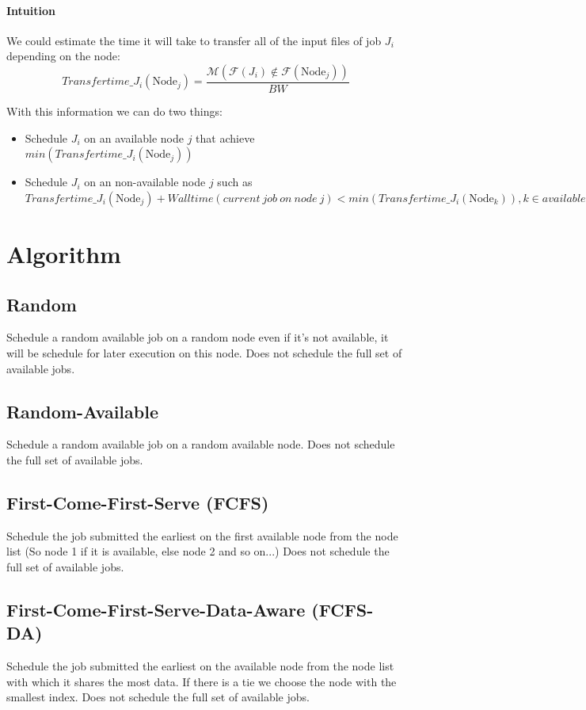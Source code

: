 \documentclass[a4paper]{article}
\newcommand{\Node}[1]{\ensuremath{\mathrm{Node}_{#1}}\xspace}
\newcommand{\inputs}{\ensuremath{\mathcal{F}}\xspace}
\newcommand{\memory}{\ensuremath{\mathcal{M}}\xspace}
\newcommand{\bandwidth}{\mathit{BW}\xspace}
\newcommand{\walltime}{\mathit{Walltime}\xspace}
\begin{document}
\paragraph{Intuition} 
We could estimate the time it will take to transfer all of the input files of job $J_i$ depending on the node:
$$
	\mathit{Transfertime\_J_i}(\Node{j}) = \frac{\memory(\inputs(J_i) \notin \inputs(\Node{j}))}{\bandwidth}
$$

With this information we can do two things:
\begin{itemize}
	\item Schedule $J_i$ on an available node $j$ that achieve $min(\mathit{Transfertime\_J_i}(\Node{j}))$
	\item Schedule $J_i$ on an non-available node $j$ such as $\mathit{Transfertime\_J_i}(\Node{j}) + \walltime(current~job~on~node~j) < min(\mathit{Transfertime\_J_i}(\Node{k})), k \in available~nodes$
\end{itemize}

\section{Algorithm}

\subsection{Random}
Schedule a random available job on a random node even if it's not available, it will be schedule for later execution on this node.
Does not schedule the full set of available jobs.

\subsection{Random-Available}
Schedule a random available job on a random available node.
Does not schedule the full set of available jobs.

\subsection{First-Come-First-Serve (FCFS)}
Schedule the job submitted the earliest on the first available node from the node list (So node 1 if it is available, else node 2 and so on...)
Does not schedule the full set of available jobs.

\subsection{First-Come-First-Serve-Data-Aware (FCFS-DA)}
Schedule the job submitted the earliest on the available node from the node list with which it shares the most data. If there is a tie we choose the node with the smallest index.
Does not schedule the full set of available jobs.
\end{document}
